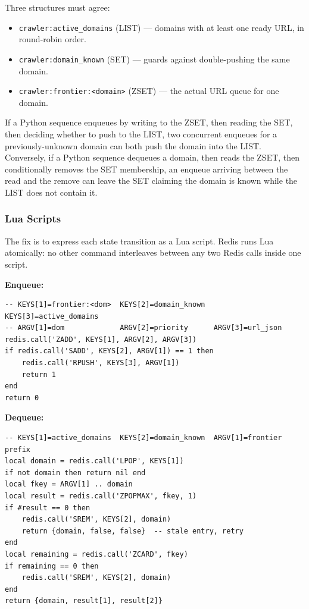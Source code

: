 \documentclass[11pt,a4paper]{article}
\newcommand{\code}[1]{\texttt{#1}}
\begin{document}
Three structures must agree:

\begin{itemize}[leftmargin=1.4em]
  \item \code{crawler:active\_domains} (LIST) --- domains with at least one ready URL, in round-robin order.
  \item \code{crawler:domain\_known} (SET) --- guards against double-pushing the same domain.
  \item \code{crawler:frontier:<domain>} (ZSET) --- the actual URL queue for one domain.
\end{itemize}

If a Python sequence enqueues by writing to the ZSET, then reading the SET, then deciding whether to push to the LIST, two concurrent enqueues for a previously-unknown domain can both push the domain into the LIST. Conversely, if a Python sequence dequeues a domain, then reads the ZSET, then conditionally removes the SET membership, an enqueue arriving between the read and the remove can leave the SET claiming the domain is known while the LIST does not contain it.

\subsubsection{Lua Scripts}

The fix is to express each state transition as a Lua script. Redis runs Lua atomically: no other command interleaves between any two Redis calls inside one script.

\textbf{Enqueue:}

\begin{lstlisting}
-- KEYS[1]=frontier:<dom>  KEYS[2]=domain_known  KEYS[3]=active_domains
-- ARGV[1]=dom             ARGV[2]=priority      ARGV[3]=url_json
redis.call('ZADD', KEYS[1], ARGV[2], ARGV[3])
if redis.call('SADD', KEYS[2], ARGV[1]) == 1 then
    redis.call('RPUSH', KEYS[3], ARGV[1])
    return 1
end
return 0
\end{lstlisting}

\textbf{Dequeue:}

\begin{lstlisting}
-- KEYS[1]=active_domains  KEYS[2]=domain_known  ARGV[1]=frontier prefix
local domain = redis.call('LPOP', KEYS[1])
if not domain then return nil end
local fkey = ARGV[1] .. domain
local result = redis.call('ZPOPMAX', fkey, 1)
if #result == 0 then
    redis.call('SREM', KEYS[2], domain)
    return {domain, false, false}  -- stale entry, retry
end
local remaining = redis.call('ZCARD', fkey)
if remaining == 0 then
    redis.call('SREM', KEYS[2], domain)
end
return {domain, result[1], result[2]}
\end{lstlisting}
\end{document}
